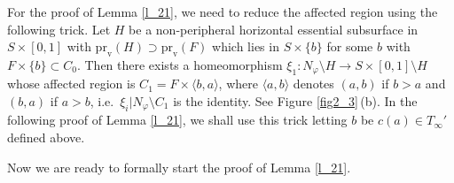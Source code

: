 \documentclass{amsart}
\theoremstyle{definition}
\numberwithin{figure}{section}
\numberwithin{equation}{section}
\newcommand{\ie}{i.e.\ }
\def\eset{\emptyset}
\def\Int{\mathrm{Int}}
\begin{document}
For the proof of  Lemma \ref{l_21}, we need to reduce the affected region using the following trick.
Let $H$ be a non-peripheral horizontal essential subsurface in $S\times [0,1]$ with $\mathrm{pr}_\mathrm{v}(H)\supset \mathrm{pr}_\mathrm{v}(F)$ which  lies in $S \times \{b\}$ for some 
$b$ with $F \times\{b\} \subset C_0$.
Then there exists a homeomorphism $\xi_1: N_\varphi\setminus H\rightarrow S\times [0,1]\setminus H$ whose affected 
region is $C_1=F\times \langle b,a\rangle$, where $\langle a,b \rangle$ denotes $(a,b)$ if $b>a$ and $(b,a)$ if $a> b$, \ie $\xi_i|N_\varphi \setminus C_1$ is the identity.
 See Figure \ref{fig2_3}\,(b).
 In the following proof of Lemma \ref{l_21}, we shall use this trick letting $b$ be $c(a) \in T_\infty'$ defined above. 
%




Now we are ready to formally start the proof of Lemma \ref{l_21}.
\end{document}

